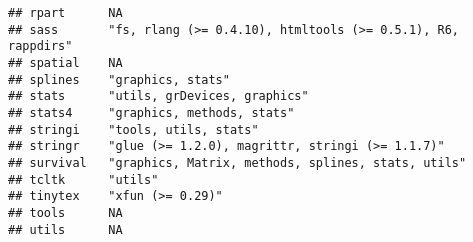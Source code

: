\documentclass[
]{article}
\begin{document}
\begin{verbatim}
## rpart      NA                                                                                                                                                                                                     
## sass       "fs, rlang (>= 0.4.10), htmltools (>= 0.5.1), R6, rappdirs"                                                                                                                                            
## spatial    NA                                                                                                                                                                                                     
## splines    "graphics, stats"                                                                                                                                                                                      
## stats      "utils, grDevices, graphics"                                                                                                                                                                           
## stats4     "graphics, methods, stats"                                                                                                                                                                             
## stringi    "tools, utils, stats"                                                                                                                                                                                  
## stringr    "glue (>= 1.2.0), magrittr, stringi (>= 1.1.7)"                                                                                                                                                        
## survival   "graphics, Matrix, methods, splines, stats, utils"                                                                                                                                                     
## tcltk      "utils"                                                                                                                                                                                                
## tinytex    "xfun (>= 0.29)"                                                                                                                                                                                       
## tools      NA                                                                                                                                                                                                     
## utils      NA                                                                                                                                                                                                     

\end{verbatim}
\end{document}
